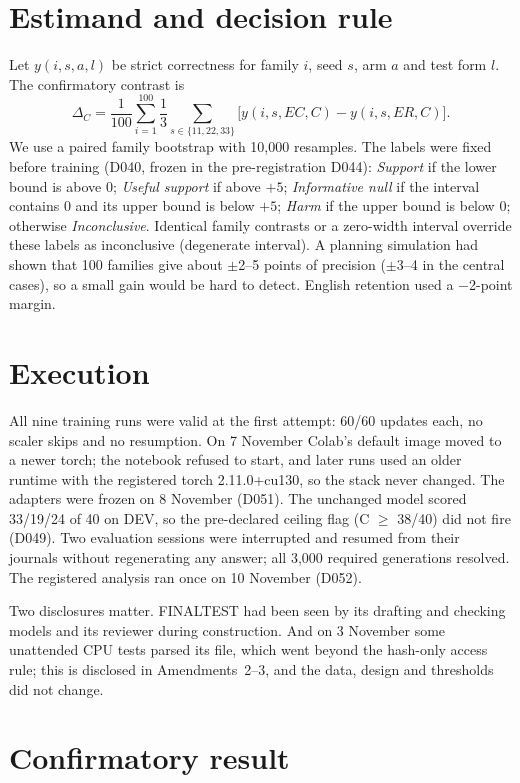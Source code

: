 \documentclass[12pt,a4paper,oneside]{report}
\renewcommand{\_}{\oldunderscore\allowbreak}
\begin{document}
\section{Estimand and decision rule}

Let $y(i,s,a,l)$ be strict correctness for family $i$, seed $s$, arm $a$ and test form $l$. The confirmatory contrast is
\[
 \Delta_C=\frac{1}{100}\sum_{i=1}^{100}\frac{1}{3}\sum_{s\in\{11,22,33\}}\bigl[y(i,s,EC,C)-y(i,s,ER,C)\bigr].
\]
We use a paired family bootstrap with 10,000 resamples. The labels were fixed before training (D040, frozen in the pre-registration D044): \emph{Support} if the lower bound is above 0; \emph{Useful support} if above $+5$; \emph{Informative null} if the interval contains 0 and its upper bound is below $+5$; \emph{Harm} if the upper bound is below 0; otherwise \emph{Inconclusive}. Identical family contrasts or a zero-width interval override these labels as inconclusive (degenerate interval). A planning simulation had shown that 100 families give about $\pm$2--5 points of precision ($\pm$3--4 in the central cases), so a small gain would be hard to detect. English retention used a $-$2-point margin.

\section{Execution}

All nine training runs were valid at the first attempt: 60/60 updates each, no scaler skips and no resumption. On 7 November Colab's default image moved to a newer torch; the notebook refused to start, and later runs used an older runtime with the registered torch 2.11.0+cu130, so the stack never changed. The adapters were frozen on 8 November (D051). The unchanged model scored 33/19/24 of 40 on DEV, so the pre-declared ceiling flag (C $\ge$ 38/40) did not fire (D049). Two evaluation sessions were interrupted and resumed from their journals without regenerating any answer; all 3,000 required generations resolved. The registered analysis ran once on 10 November (D052).

Two disclosures matter. FINAL\_TEST had been seen by its drafting and checking models and its reviewer during construction. And on 3 November some unattended CPU tests parsed its file, which went beyond the hash-only access rule; this is disclosed in Amendments~2--3, and the data, design and thresholds did not change.

\section{Confirmatory result}
\end{document}

